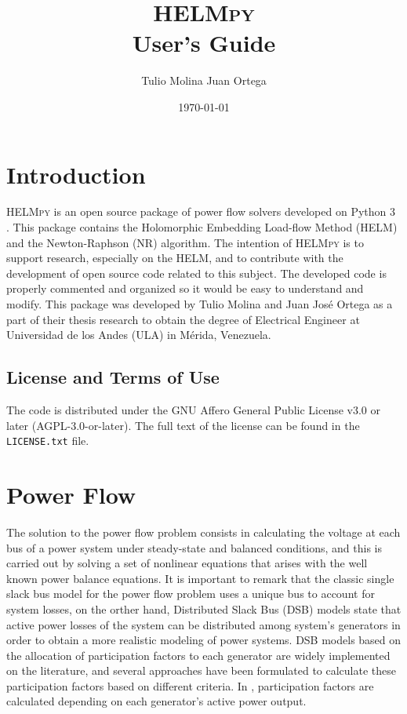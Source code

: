 \documentclass[12pt]{article}
\title{\textbf{\textsc{HELMpy} \\ User's Guide}}
\author{Tulio Molina \hspace{10mm} Juan Ortega}
\date{\today}
\begin{document}
\sloppy

\maketitle{}
\thispagestyle{empty}
\tableofcontents
\clearpage
\newpage


\section{Introduction}

\textsc{HELMpy} \cite{HELMpy} is an open source package of power flow solvers developed on Python 3 \cite{python}. This package contains the Holomorphic Embedding Load-flow Method (HELM) \cite{trias2012holomorphic} and the Newton-Raphson (NR) algorithm. The intention of \textsc{HELMpy} is to support research, especially on the HELM, and to contribute with the development of open source code related to this subject. The developed code is properly commented and organized so it would be easy to understand and modify. This package was developed by Tulio Molina and Juan José Ortega as a part of their thesis research to obtain the degree of Electrical Engineer at Universidad de los Andes (ULA) in Mérida, Venezuela. 

\subsection{License and Terms of Use}
The code is distributed under the GNU Affero General Public License v3.0  or later \cite{GNUAGPLv3} (AGPL-3.0-or-later). The full text of the license can be found in the \texttt{LICENSE.txt} file.

\section{Power Flow}
The solution to the power flow problem consists in calculating the voltage at each bus of a power system under steady-state and balanced conditions, and this is carried out by solving a set of nonlinear equations that arises with the well known power balance equations. It is important to remark that the classic single slack bus model for the power flow problem uses a unique bus to account for system losses, on the orther hand, Distributed Slack Bus (DSB) models state that active power losses of the system can be distributed among system's generators in order to obtain a more realistic modeling of power systems. DSB models based on the allocation of participation factors to each generator are widely implemented on the literature, and several approaches have been formulated to calculate these participation factors based on different criteria. In \cite{meisel1993system}, participation factors are calculated depending on each generator's active power output. 
\end{document}
